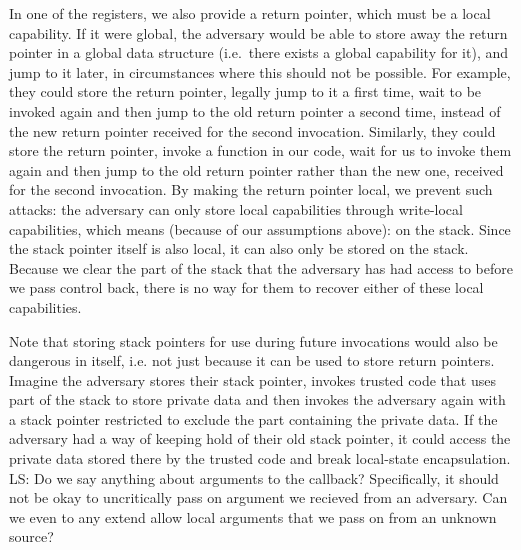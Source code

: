 \documentclass[acmsmall,review]{acmart}\settopmatter{printfolios=true}
\newcommand\lau[1]{{\color{purple} \sf \footnotesize {LS: #1}}\\}
\begin{document}
In one of the registers, we also provide a return pointer, which must be a local
capability. If it were global, the adversary would be able to store away the
return pointer in a global data structure (i.e.\ there exists a global capability for it), and jump to it later, in
circumstances where this should not be possible. For example, they could store
the return pointer, legally jump to it a first time, wait to be invoked again
and then jump to the old return pointer a second time, instead of the new return
pointer received for the second invocation. Similarly, they could store the
return pointer, invoke a function in our code, wait for us to invoke them again
and then jump to the old return pointer rather than the new one, received for the
second invocation.
%
By making the return pointer local, we prevent such attacks: the adversary can
only store local capabilities through write-local capabilities, which means (because
of our assumptions above): on the stack. Since the stack pointer itself is
also local, it can also only be stored on the stack. Because we clear the part
of the stack that the adversary has had access to before we pass control back,
there is no way for them to recover either of these local capabilities.

Note that storing stack pointers for use during future invocations would also be
dangerous in itself, i.e. not just because it can be used to store return
pointers. Imagine the adversary stores their stack pointer, invokes trusted code
that uses part of the stack to store private data and then invokes the adversary
again with a stack pointer restricted to exclude the part containing the private
data. If the adversary had a way of keeping hold of their old stack pointer, it
could access the private data stored there by the trusted code and break
local-state encapsulation.  
\lau{Do we say anything about arguments to the callback? Specifically, it should not be okay to uncritically pass on argument we recieved from an adversary. Can we even to any extend allow local arguments that we pass on from an unknown source?}
\end{document}
